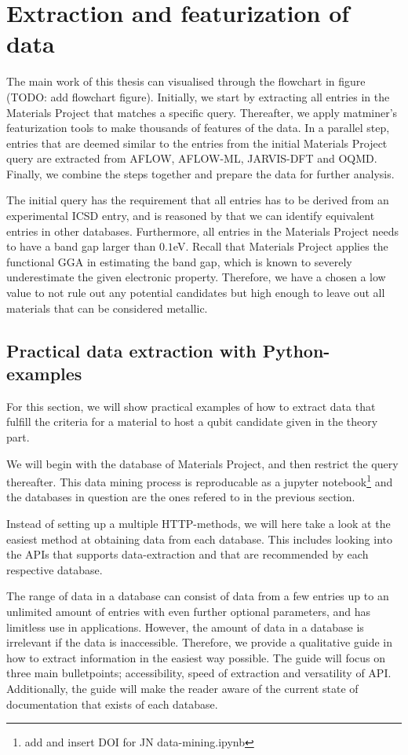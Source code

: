 \chapter{Extraction and featurization of data}

The main work of this thesis can visualised through the flowchart in figure (TODO: add flowchart figure). Initially, we start by extracting all entries in the Materials Project that matches a specific query. Thereafter, we apply matminer's featurization tools to make thousands of features of the data. In a parallel step, entries that are deemed similar to the entries from the initial Materials Project query are extracted from AFLOW, AFLOW-ML, JARVIS-DFT and OQMD. Finally, we combine the steps together and prepare the data for further analysis.

The initial query has the requirement that all entries has to be derived from an experimental ICSD entry, and is reasoned by that we can identify equivalent entries in other databases. Furthermore, all entries in the Materials Project needs to have a band gap larger than $0.1$eV. Recall that Materials Project applies the functional GGA in estimating the band gap, which is known to severely underestimate the given electronic property. Therefore, we have a chosen a low value to not rule out any potential candidates but high enough to leave out all materials that can be considered metallic.

\section{Practical data extraction with Python-examples}

For this section, we will show practical examples of how to extract data that fulfill the criteria for a material to host a qubit candidate given in the theory part.

We will begin with the database of Materials Project, and then restrict the query thereafter. This data mining process is reproducable as a jupyter notebook\footnote{add and insert DOI for JN data-mining.ipynb} and the databases in question are the ones refered to in the previous section.

Instead of setting up a multiple HTTP-methods, we will here take a look at the easiest method at obtaining data from each database. This includes looking into the APIs that supports data-extraction and that are recommended by each respective database.

The range of data in a database can consist of data from a few entries up to an unlimited amount of entries with even further optional parameters, and has limitless use in applications. However, the amount of data in a database is irrelevant if the data is inaccessible. Therefore, we provide a qualitative guide in how to extract information in the easiest way possible. The guide will focus on three main bulletpoints; accessibility, speed of extraction and versatility of API. Additionally, the guide will make the reader aware of the current state of documentation that exists of each database.

